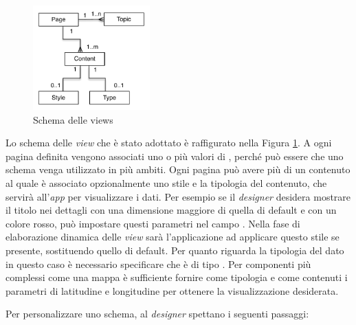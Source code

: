 \begin{figure}[ht]
	\centering
	\includegraphics[width=0.4\textwidth]{3-metodologia-camus/Immagini/view_schema.pdf}
	\caption{Schema delle views}\label{fig:view-schema}
\end{figure}

Lo schema delle \emph{view} che è stato adottato è raffigurato nella Figura \ref{fig:view-schema}. A ogni pagina definita vengono associati uno o più valori di , perché può essere che uno schema venga utilizzato in più ambiti. Ogni pagina può avere più di un contenuto al quale è associato opzionalmente uno stile e la tipologia del contenuto, che servirà all'\emph{app} per visualizzare i dati. Per esempio se il \emph{designer} desidera mostrare il titolo nei dettagli con una dimensione maggiore di quella di default e con un colore rosso, può impostare questi parametri nel campo . Nella fase di elaborazione dinamica delle \emph{view} sarà l'applicazione ad applicare questo stile se presente, sostituendo quello di default. Per quanto riguarda la tipologia del dato  in questo caso è necessario specificare che è di tipo . Per componenti più complessi come una mappa è sufficiente fornire come tipologia  e come contenuti i parametri di latitudine e longitudine per ottenere la visualizzazione desiderata.

Per personalizzare uno schema, al \emph{designer} spettano i seguenti passaggi:

